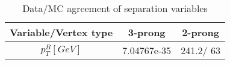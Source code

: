\begin{table}[htbp]
\caption{\label{tab:sepVars}Data/MC agreement of separation variables}
\begin{center}
\begin{tabular}{c|c|c}
Variable/Vertex type & 3-prong & 2-prong\\
\hline
$p_{T}^{B} [GeV]$ & 7.04767e-35 & 241.2/ 63\\
\hline
\end{tabular}
\end{center}
\end{table}
